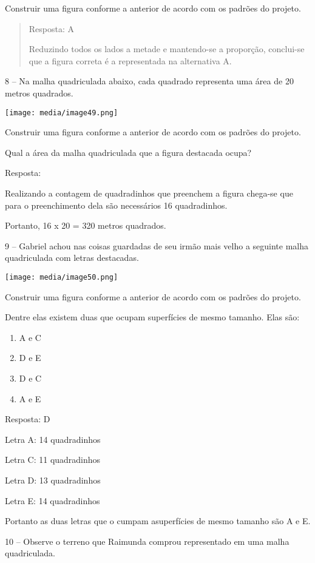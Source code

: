 Construir uma figura conforme a anterior de acordo com os padrões do
projeto.

\begin{quote}
Resposta: A

Reduzindo todos os lados a metade e mantendo-se a proporção, conclui-se
que a figura correta é a representada na alternativa A.
\end{quote}

8 -- Na malha quadriculada abaixo, cada quadrado representa uma área de
20 metros quadrados.

\texttt{[image: media/image49.png]}

Construir uma figura conforme a anterior de acordo com os padrões do
projeto.

Qual a área da malha quadriculada que a figura destacada ocupa?

Resposta:

Realizando a contagem de quadradinhos que preenchem a figura chega-se
que para o preenchimento dela são necessários 16 quadradinhos.

Portanto, 16 x 20 = 320 metros quadrados.

9 -- Gabriel achou nas coisas guardadas de seu irmão mais velho a
seguinte malha quadriculada com letras destacadas.

\texttt{[image: media/image50.png]}

Construir uma figura conforme a anterior de acordo com os padrões do
projeto.

Dentre elas existem duas que ocupam superfícies de mesmo tamanho. Elas
são:

\begin{enumerate}
\def\labelenumi{\alph{enumi})}
\item
  A e C
\item
  D e E
\item
  D e C
\item
  A e E
\end{enumerate}

Resposta: D

Letra A: 14 quadradinhos

Letra C: 11 quadradinhos

Letra D: 13 quadradinhos

Letra E: 14 quadradinhos

Portanto as duas letras que o cumpam asuperfícies de mesmo tamanho são A
e E.

10 -- Observe o terreno que Raimunda comprou representado em uma malha
quadriculada.

